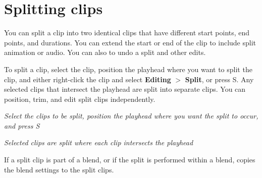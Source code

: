 \chapter{Splitting clips}
\hypertarget{md__hey_tea_9_2_library_2_package_cache_2com_8unity_8timeline_0d1_87_85_2_documentation_0i_2clp__split}{}\label{md__hey_tea_9_2_library_2_package_cache_2com_8unity_8timeline_0d1_87_85_2_documentation_0i_2clp__split}
\label{md__hey_tea_9_2_library_2_package_cache_2com_8unity_8timeline_0d1_87_85_2_documentation_0i_2clp__split_autotoc_md4627}%
%
 You can split a clip into two identical clips that have different start points, end points, and durations. You can extend the start or end of the clip to include split animation or audio. You can also  to undo a split and other edits.

To split a clip, select the clip, position the playhead where you want to split the clip, and either right-\/click the clip and select {\bfseries{Editing}} \texorpdfstring{$>$}{>} {\bfseries{Split}}, or press S. Any selected clips that intersect the playhead are split into separate clips. You can position, trim, and edit split clips independently.



{\itshape Select the clips to be split, position the playhead where you want the split to occur, and press S}



{\itshape Selected clips are split where each clip intersects the playhead}

If a split clip is part of a blend, or if the split is performed within a blend,  copies the blend settings to the split clips. 
